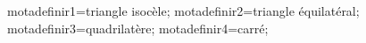 \documentclass[exercice]{thedocument}%
\begin{document}
%
\>motadefinir1=triangle isocèle;%
\>motadefinir2=triangle équilatéral;%
\>motadefinir3=quadrilatère;%
\>motadefinir4=carré;%
%
\end{document}
